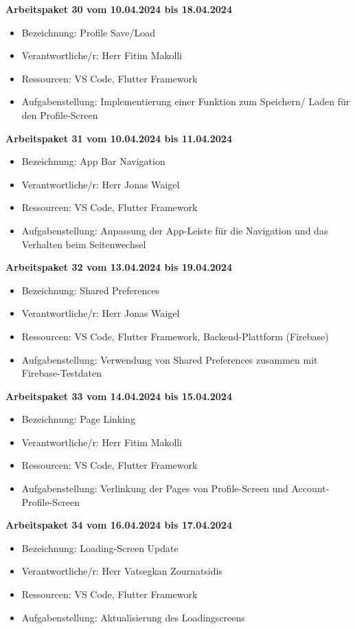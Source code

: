 \textbf{Arbeitspaket 30 vom 10.04.2024 bis 18.04.2024}
\begin{itemize}[itemsep=0pt]
    \item{Bezeichnung: Profile Save/Load} 
	\item{Verantwortliche/r: Herr Fitim Makolli} 
	\item{Ressourcen: VS Code, Flutter Framework} 
    \item{Aufgabenstellung: Implementierung einer Funktion zum Speichern/ Laden für den Profile-Screen}
\end{itemize}

\textbf{Arbeitspaket 31 vom 10.04.2024 bis 11.04.2024}
\begin{itemize}[itemsep=0pt]
    \item{Bezeichnung: App Bar Navigation} 
	\item{Verantwortliche/r: Herr Jonas Waigel} 
	\item{Ressourcen: VS Code, Flutter Framework} 
    \item{Aufgabenstellung: Anpassung der App-Leiste für die Navigation und das Verhalten beim Seitenwechsel}
\end{itemize} 

\textbf{Arbeitspaket 32 vom 13.04.2024 bis 19.04.2024}
\begin{itemize}[itemsep=0pt]
    \item{Bezeichnung: Shared Preferences} 
	\item{Verantwortliche/r: Herr Jonas Waigel} 
	\item{Ressourcen: VS Code, Flutter Framework, Backend-Plattform (Firebase)}
    \item{Aufgabenstellung: Verwendung von Shared Preferences zusammen mit Firebase-Testdaten} 
\end{itemize}

\newpage
\textbf{Arbeitspaket 33 vom 14.04.2024 bis 15.04.2024}
\begin{itemize}[itemsep=0pt]
    \item{Bezeichnung: Page Linking} 
	\item{Verantwortliche/r: Herr Fitim Makolli} 
	\item{Ressourcen: VS Code, Flutter Framework} 
    \item{Aufgabenstellung: Verlinkung der Pages von Profile-Screen und Account-Profile-Screen}
\end{itemize}

\textbf{Arbeitspaket 34 vom 16.04.2024 bis 17.04.2024}
\begin{itemize}[itemsep=0pt]
    \item{Bezeichnung: Loading-Screen Update} 
	\item{Verantwortliche/r: Herr Vatsegkan Zournatsidis} 
	\item{Ressourcen: VS Code, Flutter Framework} 
    \item{Aufgabenstellung: Aktualisierung des Loadingscreens}
\end{itemize} 


